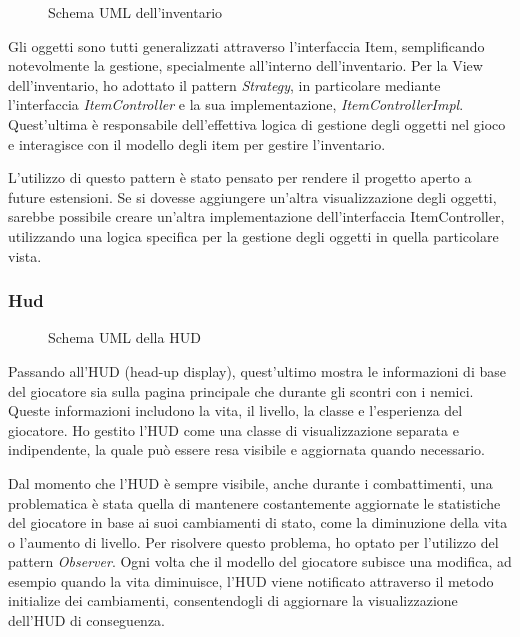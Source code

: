 \documentclass[a4paper,12pt]{report}
\begin{document}
\begin{figure}[H]
	\centering
	
	\caption{Schema UML dell'inventario}
	\label{fig:the-exiled-inventory-uml}
\end{figure}

Gli oggetti sono tutti generalizzati attraverso l'interfaccia Item, semplificando notevolmente la gestione, specialmente all'interno dell'inventario. Per la View dell'inventario, ho adottato il pattern \textit{Strategy}, in particolare mediante l'interfaccia \textit{ItemController} e la sua implementazione, \textit{ItemControllerImpl}. Quest'ultima è responsabile dell'effettiva logica di gestione degli oggetti nel gioco e interagisce con il modello degli item per gestire l'inventario.

L'utilizzo di questo pattern è stato pensato per rendere il progetto aperto a future estensioni. Se si dovesse aggiungere un'altra visualizzazione degli oggetti, sarebbe possibile creare un'altra implementazione dell'interfaccia ItemController, utilizzando una logica specifica per la gestione degli oggetti in quella particolare vista.
\subsubsection{Hud}
\begin{figure}[H]
	\centering
	
	\caption{Schema UML della HUD}
	\label{fig:the-exiled-hud-uml}
\end{figure}

Passando all'HUD (head-up display), quest'ultimo mostra le informazioni di base del giocatore sia sulla pagina principale che durante gli scontri con i nemici. Queste informazioni includono la vita, il livello, la classe e l'esperienza del giocatore. Ho gestito l'HUD come una classe di visualizzazione separata e indipendente, la quale può essere resa visibile e aggiornata quando necessario.

Dal momento che l'HUD è sempre visibile, anche durante i combattimenti, una problematica è stata quella di mantenere costantemente aggiornate le statistiche del giocatore in base ai suoi cambiamenti di stato, come la diminuzione della vita o l'aumento di livello. Per risolvere questo problema, ho optato per l'utilizzo del pattern \textit{Observer}. Ogni volta che il modello del giocatore subisce una modifica, ad esempio quando la vita diminuisce, l'HUD viene notificato attraverso il metodo initialize dei cambiamenti, consentendogli di aggiornare la visualizzazione dell'HUD di conseguenza.
\end{document}
